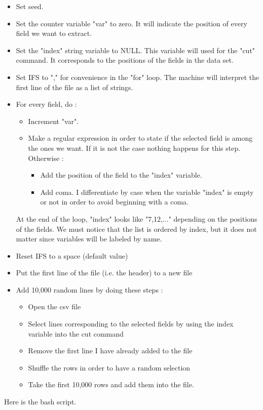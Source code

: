 \documentclass{llncs}\usepackage[]{graphicx}\usepackage[]{color}
\begin{document}
\begin{itemize}
\item Set seed.
\item Set the counter variable "var" to zero. It will indicate the position of every field we want to extract.
\item Set the "index" string variable to NULL. This variable will used for the "cut" command. It corresponds to the positions of the fields in the data set.
\item Set IFS to "," for convenience in the "for" loop. The machine will interpret the first line of the file as a list of strings.
\item For every field, do :
\begin{itemize}
\item Increment "var".
\item Make a regular expression in order to state if the selected field is among the ones we want. If it is not the case nothing happens for this step. Otherwise :
\begin{itemize}
\item Add the position of the field to the "index" variable. 
\item Add coma. I differentiate by case when the variable "index" is empty or not in order to avoid beginning with a coma.
\end{itemize}
\end{itemize}
At the end of the loop, "index" looks like "7,12,..." depending on the positions of the fields. We must notice that the list is ordered by index, but it does not matter since variables will be labeled by name.
\item Reset IFS to a space (default value)
\item Put the first line of the file (i.e. the header) to a new file
\item Add 10,000 random lines by doing these steps :
\begin{itemize}
\item Open the csv file
\item Select lines corresponding to the selected fields by using the index variable into the cut command
\item Remove the first line I have already added to the file
\item Shuffle the rows in order to have a random selection
\item Take the first 10,000 rows and add them into the file.
\end{itemize}
\end{itemize}
\noindent
Here is the bash script.
\end{document}
